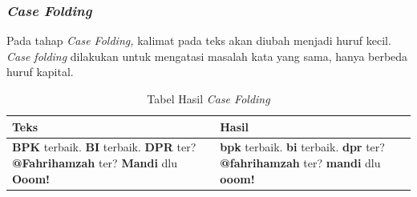 \begin{adjustbox}{width=1\textwidth}
\begin{minipage}{\linewidth}
\end{minipage}
\end{adjustbox}

\subsubsection{\textit{Case Folding}}
Pada tahap \textit{Case Folding, }kalimat pada teks akan diubah menjadi huruf kecil. \textit{Case folding }dilakukan untuk mengatasi masalah kata yang sama, hanya berbeda huruf kapital.

\begin{table}[H]
	\caption{Tabel Hasil \textit{Case Folding}}
	\centering
	\small
	\begin{adjustbox}{width=1\textwidth}
	\begin{tabular}{|p{6.50cm}|p{6.50cm}|}
		\hline
		\textbf{Teks} & \textbf{Hasil} \\
		\hline
		\textbf{BPK} terbaik. \textbf{BI} terbaik. \textbf{DPR} ter? \textbf{@Fahrihamzah} ter? \textbf{Mandi} dlu \textbf{Ooom!} 
		& \textbf{bpk} terbaik. \textbf{bi} terbaik. \textbf{dpr} ter? \textbf{@fahrihamzah} ter? \textbf{mandi} dlu \textbf{ooom!} \\
		\hline
	\end{tabular}
	\end{adjustbox}
\end{table}
